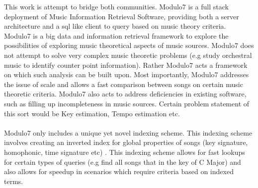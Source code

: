 This work is attempt to bridge both communities. Modulo7 is a full stack deployment of Music Information Retrieval Software, providing both a server architecture and a sql like client to query based on music theory criteria. Modulo7 is a big data and information retrieval framework to explore the possibilities of exploring music theoretical aspects of music sources. Modulo7 does not attempt to solve very complex music theoretic problems (e.g study orchestral music to identify counter point information). Rather Modulo7 acts a framework on which such analysis can be built upon. Most importantly, Modulo7 addresses the issue of scale and allows a fast comparison between songs on certain music theoretic criteria. Modulo7 also acts to address deficiencies in existing software, such as filling up incompleteness in music sources. Certain problem statement of this sort would be Key estimation, Tempo estimation etc. \\\\
Modulo7 only includes a unique yet novel indexing scheme. This indexing scheme involves creating an inverted index for global properties of songs (key signature, homophonic, time signature etc) . This indexing scheme allows for fast lookups for certain types of queries (e.g find all songs that in the key of C Major) and also allows for speedup in scenarios which require criteria based on indexed terms. 